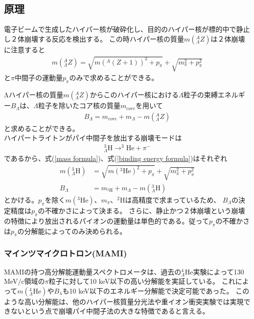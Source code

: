 \documentclass[a4paper,11pt,uplatex]{jsbook}
\begin{document}
\subsection{原理}
電子ビームで生成したハイパー核が破砕化し、目的のハイパー核が標的中で静止し２体崩壊する反応を検出する。
この時ハイパー核の質量$m(^A_{\Lambda}Z)$は２体崩壊に注意すると
\begin{eqnarray}
  m(^A_{\Lambda}Z) = \sqrt{m(^A(Z+1))^2 + p_\pi} + \sqrt{m_\pi^2 + p_\pi^2} \label{mass formula}
\end{eqnarray}
と$\pi$中間子の運動量$p_\pi$のみで求めることができる。

Λハイパー核の質量$m(^A_\Lambda Z)$からこのハイパー核における$\Lambda$粒子の束縛エネルギー$B_\Lambda$は、$\Lambda$粒子を除いたコア核の質量$m_{core}$を用いて
\begin{eqnarray}
  B_\Lambda = m_{core} + m_\Lambda - m(^A_\Lambda Z) \label{binding energy formula}
\end{eqnarray}
と求めることができる。
\\ハイパートライトンがパイ中間子を放出する崩壊モードは
\begin{eqnarray}
  ^3_{\Lambda}\text{H} \rightarrow ^3\text{He} + \pi^-
\end{eqnarray}
であるから、式(\ref{mass formula})、式(\ref{binding energy formula})はそれぞれ
\begin{eqnarray}
  m(^3_\Lambda \text{H}) &= \sqrt{m(^3\text{He})^2 + p_\pi} + \sqrt{m_\pi^2 + p_\pi^2} \\
  B_\Lambda &= m_{^2\text{H}} + m_\Lambda - m(^3_\Lambda \text{H})
\end{eqnarray}
とかける。$p_\pi$を除く$m(^3\text{He})$、$m_\pi$、$^2\text{H}$は高精度で求まっているため、
$B_\Lambda$の決定精度は$p_\pi$の不確かさによって決まる。
さらに、静止かつ２体崩壊という崩壊の特徴により放出されるパイオンの運動量は単色的である。従って$p_\pi$の不確かさは$p_\pi$の分解能によってのみ決められる。\\
\subsubsection{マインツマイクロトロン(MAMI)}
MAMIの持つ高分解能運動量スペクトロメータは、過去の$^4_\Lambda \text{He}$実験によって130 MeV/c領域の$\pi$粒子に対して10 keV以下の高い分解能を実証している。
これによって$m(^4_\Lambda \text{He})$や$B_\lambda$も10 keV以下のエネルギー分解能で決定可能であった。
このような高い分解能は、他のハイパー核質量分光法や重イオン衝突実験では実現できないという点で崩壊パイ中間子法の大きな特徴であると言える。
\end{document}
